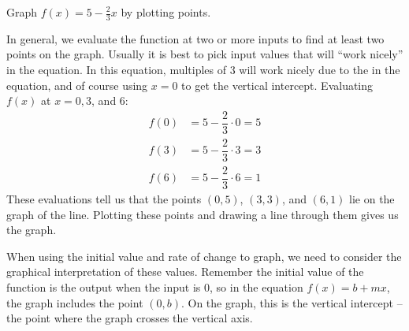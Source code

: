 \begin{example}
Graph $f(x) = 5 - \frac{2}{3} x$ by plotting points.

\begin{solution} In general, we evaluate the function at two or more inputs to find at least two points on the graph. Usually it is best to pick input values that will ``work nicely'' in the equation. In this equation, multiples of 3 will work nicely due to the in the equation, and of course using $x = 0$ to get the vertical intercept. Evaluating $f(x)$ at $x = 0, 3$, and $6$:
\begin{align*}
f(0) &= 5 - \dfrac{2}{3} \cdot 0 = 5 \\
f(3) &= 5 - \dfrac{2}{3} \cdot 3 = 3 \\
f(6) &= 5 - \dfrac{2}{3} \cdot 6 = 1
\end{align*}
These evaluations tell us that the points $(0,5)$, $(3,3)$, and $(6,1)$ lie on the graph of the line. Plotting these points and drawing a line through them gives us the graph.

\begin{center}
\end{center}



\end{solution}\end{example}

When using the initial value and rate of change to graph, we need to consider the graphical interpretation of these values. Remember the initial value of the function is the output when the input is $0$, so in the equation $f(x) = b + mx$, the graph includes the point $(0, b)$. On the graph, this is the vertical intercept -- the point where the graph crosses the vertical axis.

